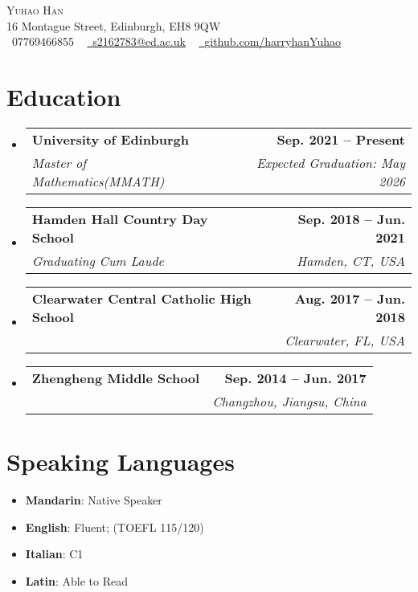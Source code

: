 \documentclass[letterpaper,11pt]{article}
\makeatletter
\newcommand{\resumeSubheading}[4]{
  \vspace{-2pt}\item
    \begin{tabular*}{1.0\textwidth}[t]{l@{\extracolsep{\fill}}r}
      \textbf{#1} & \textbf{\small #2} \\
      \textit{\small#3} & \textit{\small #4} \\
    \end{tabular*}\vspace{-7pt}
}
\newcommand{\resumeSubHeadingListStart}{\begin{itemize}[leftmargin=0.0in, label={}]}
\newcommand{\resumeSubHeadingListEnd}{\end{itemize}}
\makeatother
\begin{document}

\begin{center}
    {\Huge \scshape Yuhao Han} \\ \vspace{1pt}
    16 Montague Street, Edinburgh, EH8 9QW
    \\ \vspace{1pt}
    \small \raisebox{-0.1\height}\faPhone\ 07769466855 ~ \href{mailto:s2162783@ed.ac.uk}{\raisebox{-0.2\height}\faEnvelope\  \underline{s2162783@ed.ac.uk}} ~ 
    \href{https://github.com/harryhanYuhao}{\raisebox{-0.2\height}\faGithub\ \underline{github.com/harryhanYuhao}}
    \vspace{-8pt}
\end{center}


\section{Education}
  \resumeSubHeadingListStart
    \resumeSubheading
      {University of Edinburgh}{Sep. 2021 -- Present}
      {Master of Mathematics(MMATH)}{Expected Graduation: May 2026}
    \resumeSubheading
      {Hamden Hall Country Day School}{Sep. 2018 -- Jun. 2021}
      {Graduating Cum Laude}{Hamden, CT, USA}
    \resumeSubheading
      {Clearwater Central Catholic High School}{Aug. 2017 -- Jun. 2018}
      {}{Clearwater, FL, USA}
    \resumeSubheading
      {Zhengheng Middle School}{Sep. 2014 -- Jun. 2017}
      {}{Changzhou, Jiangsu, China}
  \resumeSubHeadingListEnd

\section{Speaking Languages}
\begin{multicols}{2}
\begin{itemize}[itemsep=-5pt, parsep=3pt]
    \item \small   \textbf{Mandarin}: Native Speaker
    \item    \textbf{English}: Fluent; (TOEFL 115/120) 
    \item    \textbf{Italian}: C1 
    \item    \textbf{Latin}: Able to Read
  \end{itemize}
 \end{multicols}
\end{document}
